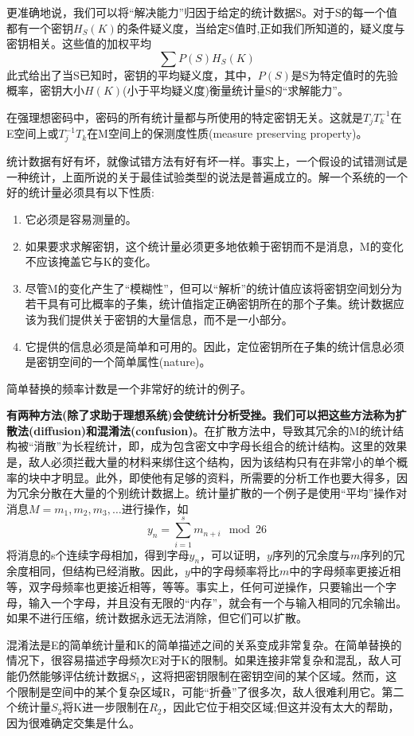 \documentclass[]{article}
\begin{document}
更准确地说，我们可以将“解决能力”归因于给定的统计数据S。对于S的每一个值都有一个密钥$H_S(K)$的条件疑义度，当给定S值时,正如我们所知道的，疑义度与密钥相关。这些值的加权平均\[\sum{P(S)H_S(K)}\]此式给出了当S已知时，密钥的平均疑义度，其中，$P(S)$是S为特定值时的先验概率，密钥大小$H(K)$(小于平均疑义度)衡量统计量S的“求解能力”。

在强理想密码中，密码的所有统计量都与所使用的特定密钥无关。这就是$T_jT_k^{-1}$在E空间上或$T_j^{-1}T_k$在M空间上的保测度性质(measure preserving property)。

统计数据有好有坏，就像试错方法有好有坏一样。事实上，一个假设的试错测试是一种统计，上面所说的关于最佳试验类型的说法是普遍成立的。解一个系统的一个好的统计量必须具有以下性质:
\begin{enumerate}
	\item 它必须是容易测量的。
	\item 如果要求求解密钥，这个统计量必须更多地依赖于密钥而不是消息，M的变化不应该掩盖它与K的变化。 
	\item 尽管M的变化产生了“模糊性”，但可以“解析”的统计值应该将密钥空间划分为若干具有可比概率的子集，统计值指定正确密钥所在的那个子集。统计数据应该为我们提供关于密钥的大量信息，而不是一小部分。
	\item 它提供的信息必须是简单和可用的。因此，定位密钥所在子集的统计信息必须是密钥空间的一个简单属性(nature)。
\end{enumerate}

简单替换的频率计数是一个非常好的统计的例子。

\textbf{有两种方法(除了求助于理想系统)会使统计分析受挫。我们可以把这些方法称为扩散法(diffusion)和混淆法(confusion)}。在扩散方法中，导致其冗余的M的统计结构被“消散”为长程统计，即，成为包含密文中字母长组合的统计结构。这里的效果是，敌人必须拦截大量的材料来绑住这个结构，因为该结构只有在非常小的单个概率的块中才明显。此外，即使他有足够的资料，所需要的分析工作也要大得多，因为冗余分散在大量的个别统计数据上。统计量扩散的一个例子是使用“平均”操作对消息$M=m_1,m_2,m_3,\dots$进行操作，如
\[y_n=\sum_{i=1}^{s} m_{n+i}\mod{26}\]
将消息的s个连续字母相加，得到字母$y_n$，可以证明，$y$序列的冗余度与$m$序列的冗余度相同，但结构已经消散。因此，$y$中的字母频率将比$m$中的字母频率更接近相等，双字母频率也更接近相等，等等。事实上，任何可逆操作，只要输出一个字母，输入一个字母，并且没有无限的“内存”，就会有一个与输入相同的冗余输出。如果不进行压缩，统计数据永远无法消除，但它们可以扩散。


混淆法是E的简单统计量和K的简单描述之间的关系变成非常复杂。在简单替换的情况下，很容易描述字母频次E对于K的限制。如果连接非常复杂和混乱，敌人可能仍然能够评估统计数据$S_1$，这将把密钥限制在密钥空间的某个区域。然而，这个限制是空间中的某个复杂区域R，可能“折叠”了很多次，敌人很难利用它。第二个统计量$S_2$将K进一步限制在$R_2$，因此它位于相交区域;但这并没有太大的帮助，因为很难确定交集是什么。
\end{document}

